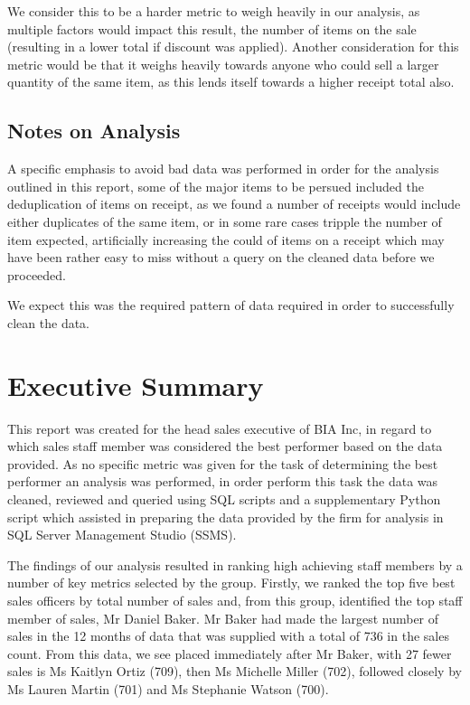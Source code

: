 \documentclass{article}
\begin{document}
            We consider this to be a harder metric to weigh heavily in our analysis,
            as multiple factors would impact this result, the number of items on the sale
            (resulting in a lower total if discount was applied). Another consideration 
            for this metric would be that it weighs heavily towards anyone who could
            sell a larger quantity of the same item, as this lends itself towards a higher
            receipt total also.

        \subsection{Notes on Analysis}
            A specific emphasis to avoid bad data was performed in order for the analysis 
            outlined in this report, some of the major items to be persued included 
            the deduplication of items on receipt, as we found a number of receipts would include
            either duplicates of the same item, or in some rare cases tripple the number
            of item expected, artificially increasing the could of items on a receipt 
            which may have been rather easy to miss without a query on the cleaned data 
            before we proceeded.
            \par
            We expect this was the required pattern of data required in order to successfully 
            clean the data.

    \newpage
    \section{Executive Summary}
    \label{sec:Executive Summary}
    This report was created for the head sales executive of BIA Inc, 
    in regard to which sales staff member was considered the best performer 
    based on the data provided. As no specific metric was given for the task 
    of determining the best performer an analysis was performed, in order 
    perform this task the data was cleaned, reviewed and queried using
    SQL scripts and a supplementary Python script which assisted in
    preparing the data provided by the firm for analysis in SQL Server Management Studio
    (SSMS).
    \vspace{5mm}
    \par\noindent
    
    \noindent The findings of our analysis resulted in ranking high achieving staff
    members by a number of key metrics selected by the group. Firstly, we ranked the
    top five best sales officers by total number of sales and, from this group, identified 
    the top staff member of sales, Mr Daniel Baker. Mr Baker had made the
    largest number of sales in the 12 months of data that was supplied with a total of 736
    in the sales count. From this data, we see placed immediately after Mr Baker, with 27
    fewer sales is Ms Kaitlyn Ortiz (709), then Ms Michelle Miller (702), followed closely
    by Ms Lauren Martin (701) and Ms Stephanie Watson (700).
    \vspace{5mm}
    \par\noindent
    
\end{document}
